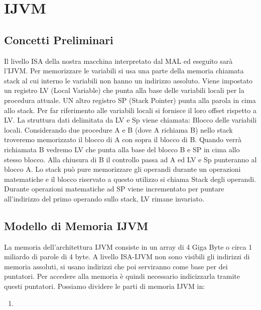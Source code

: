 \chapter{IJVM}
\section{Concetti Preliminari}
Il livello ISA della nostra macchina interpretato dal MAL ed eseguito sarà l'IJVM.
Per memorizzare le variabili si usa una parte della memoria chiamata stack al cui interno le variabili non hanno un indirizzo assoluto. Viene impostato un registro LV (Local Variable) che punta alla base delle variabili locali per la procedura attuale. UN altro registro SP (Stack Pointer) punta alla parola in cima allo stack. Per far riferimento alle variabili locali si fornisce il loro offset rispetto a LV. La struttura dati delimitata da LV e Sp viene chiamata: Blocco delle variabili locali. Considerando due procedure A e B (dove A richiama B) nello stack troveremo memorizzato il blocco di A con sopra il blocco di B. Quando verrà richiamata B vedremo LV che punta alla base del blocco B e SP in cima allo stesso blocco. Alla chiusura di B il controllo passa ad A ed LV e Sp punteranno al blocco A. Lo stack può pure memorizzare gli operandi durante un operazioni matematiche e il blocco riservato a questo utilizzo si chiama Stack degli operandi. Durante operazioni matematiche ad SP viene incrementato per puntare all'indirizzo del primo operando sullo stack, LV rimane invariato.
\section{Modello di Memoria IJVM}
La memoria dell'architettura IJVM consiste in un array di 4 Giga Byte o circa 1 miliardo di parole di 4 byte.
A livello ISA-IJVM non sono visibili gli indirizzi di memoria assoluti, si usano indirizzi che poi serviranno come base per dei puntatori. Per accedere alla memoria è quindi necessario indicizzarla tramite questi puntatori.
Possiamo dividere le parti di memoria IJVM in:
\begin{enumerate}
\item
\end{enumerate} 
